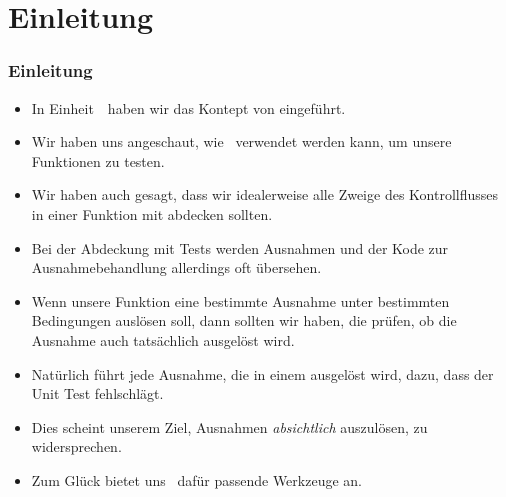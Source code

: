 \documentclass[aspectratio=169,mathserif,notheorems]{beamer}%
\subtitle{33.~Zwischenspiel:~Testen auf Ausnahmen}%
\begin{document}
%
%
\startPresentation%
%
\section{Einleitung}%
\begin{frame}%
\frametitle{Einleitung}%
\begin{itemize}%
\item In Einheit~\unitUnitTests\ haben wir das Kontept von  eingeführt.%
%
\item<2-> Wir haben uns angeschaut, wie \pytest\ verwendet werden kann, um unsere Funktionen zu testen.%
%
\item<3-> Wir haben auch gesagt, dass wir idealerweise alle Zweige des Kontrollflusses in einer Funktion mit  abdecken sollten.%
%
\item<4-> Bei der Abdeckung mit Tests werden Ausnahmen und der Kode zur Ausnahmebehandlung allerdings oft übersehen.%
%
\item<5-> Wenn unsere Funktion eine bestimmte Ausnahme unter bestimmten Bedingungen auslösen soll, dann sollten wir  haben, die prüfen, ob die Ausnahme auch tatsächlich ausgelöst wird.%
%
\item<6-> Natürlich führt jede Ausnahme, die in einem  ausgelöst wird, dazu, dass der Unit Test fehlschlägt.%
%
\item<7-> Dies scheint unserem Ziel, Ausnahmen \emph{absichtlich} auszulösen, zu widersprechen.%
%
\item<8-> Zum Glück bietet uns \pytest\ dafür passende Werkzeuge an.%
\end{itemize}%
\end{frame}%
%
%
\end{document}
